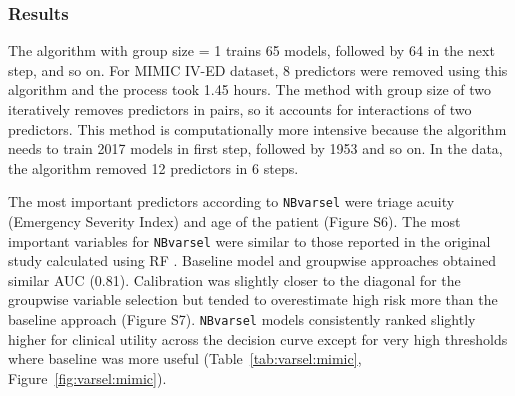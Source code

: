 \subsubsection{Results}

The algorithm with group size = 1 trains 65 models, followed by 64 in the next step, and so on. For MIMIC IV-ED dataset, 8 predictors were removed using this algorithm and the process took 1.45 hours. The method with group size of two iteratively removes predictors in pairs, so it accounts for interactions of two predictors. This method is computationally more intensive because the algorithm needs to train 2017 models in first step, followed by 1953 and so on. In the data, the algorithm removed 12 predictors in 6 steps.

The most important predictors according to \texttt{NBvarsel} were triage acuity (Emergency Severity Index) and age of the patient (Figure S6). The most important variables for \texttt{NBvarsel} were similar to those reported in the original study calculated using RF \cite{xieBenchmarkingEmergencyDepartment2022}. Baseline model and groupwise approaches obtained similar AUC (0.81). Calibration was slightly closer to the diagonal for the groupwise variable selection but tended to overestimate high risk more than the baseline approach (Figure S7). \texttt{NBvarsel} models consistently ranked slightly higher for clinical utility across the decision curve except for very high thresholds where baseline was more useful (Table~\ref{tab:varsel:mimic}, Figure~\ref{fig:varsel:mimic}).

